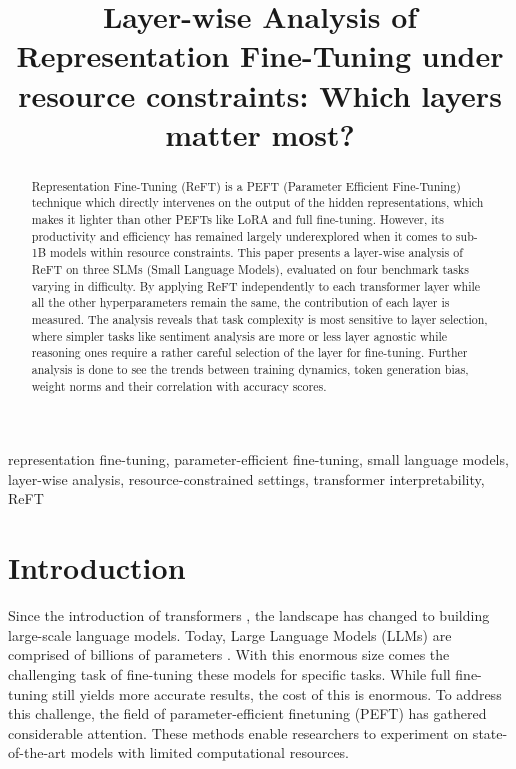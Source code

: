 \documentclass[conference]{IEEEtran}
\begin{document}
	
	\title{Layer-wise Analysis of Representation Fine-Tuning under resource constraints: Which layers matter most?}
	
	\author{
		}
	
	\maketitle
	
	\begin{abstract}
		Representation Fine-Tuning (ReFT) is a PEFT (Parameter Efficient Fine-Tuning) technique which directly intervenes on the output of the hidden representations, which makes it lighter than other PEFTs like LoRA and full fine-tuning. However, its productivity and efficiency has remained largely underexplored when it comes to sub-1B models within resource constraints. This paper presents a layer-wise analysis of ReFT on three SLMs (Small Language Models), evaluated on four benchmark tasks varying in difficulty. By applying ReFT independently to each transformer layer while all the other hyperparameters remain the same, the contribution of each layer is measured. The analysis reveals that task complexity is most sensitive to layer selection, where simpler tasks like sentiment analysis are more or less layer agnostic while reasoning ones require a rather careful selection of the layer for fine-tuning. Further analysis is done to see the trends between training dynamics, token generation bias, weight norms and their correlation with accuracy scores.
	\end{abstract}
	
	\begin{IEEEkeywords}
		representation fine-tuning, parameter-efficient fine-tuning, small language models, layer-wise analysis, resource-constrained settings, transformer interpretability, ReFT
	\end{IEEEkeywords}
	
	\section{Introduction}
	
	Since the introduction of transformers \cite{vaswani2017attention}, the landscape has changed to building large-scale language models. Today, Large Language Models (LLMs) are comprised of billions of parameters \cite{brown2020language}. With this enormous size comes the challenging task of fine-tuning these models for specific tasks. While full fine-tuning still yields more accurate results, the cost of this is enormous. To address this challenge, the field of parameter-efficient finetuning (PEFT) has gathered considerable attention. These methods enable researchers to experiment on state-of-the-art models with limited computational resources.
	
\end{document}
